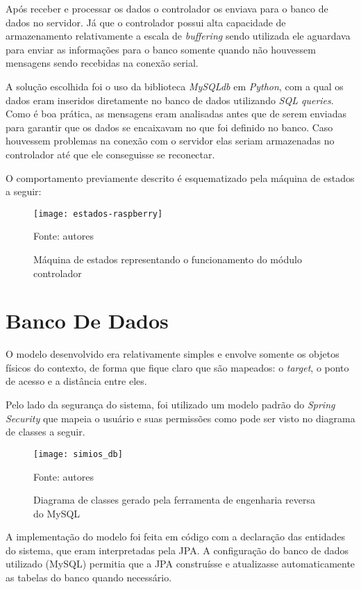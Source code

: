 Após receber e processar os dados o controlador os enviava para o banco de dados no servidor. Já que o controlador possui alta capacidade de armazenamento relativamente a escala de \emph{buffering} sendo utilizada ele aguardava para enviar as informações para o banco somente quando não houvessem mensagens sendo recebidas na conexão serial.

A solução escolhida foi o uso da biblioteca \emph{MySQLdb} em \emph{Python}, com a qual os dados eram inseridos diretamente no banco de dados utilizando \emph{SQL queries}. Como é boa prática, as mensagens eram analisadas antes que de serem enviadas para garantir que os dados se encaixavam no que foi definido no banco. Caso houvessem problemas na conexão com o servidor elas seriam armazenadas no controlador até que ele conseguisse se reconectar.

O comportamento previamente descrito é esquematizado pela máquina de estados a seguir:

\begin{figure}[ht]
  \centering
    \caption{Máquina de estados representando o funcionamento do módulo controlador}
    \texttt{[image: estados-raspberry]}
  \centerline{\small{Fonte: autores}}
\end{figure}
\FloatBarrier

\section{Banco De Dados}

O modelo desenvolvido era relativamente simples e envolve somente os objetos físicos do contexto, de forma que fique claro que são mapeados: o \emph{target}, o ponto de acesso e a distância entre eles.

Pelo lado da segurança do sistema, foi utilizado um modelo padrão do \emph{Spring Security} que mapeia o usuário e suas permissões como pode ser visto no diagrama de classes a seguir.

\begin{figure}[ht]
  \centering
    \caption{Diagrama de classes gerado pela ferramenta de engenharia reversa do MySQL}
    \texttt{[image: simios\_db]}
  \centerline{\small{Fonte: autores}}
\end{figure}
\FloatBarrier

A implementação do modelo foi feita em código com a declaração das entidades do sistema, que eram interpretadas pela JPA. A configuração do banco de dados utilizado (MySQL) permitia que a JPA construísse e atualizasse automaticamente as tabelas do banco quando necessário.

